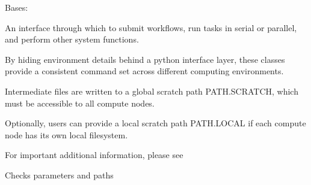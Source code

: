 \documentclass[letterpaper,10pt,english]{sphinxmanual}
\begin{document}
\begin{fulllineitems}
\label{\detokenize{ref/seisflows.system:seisflows.system.lsf_lg.lsf_lg}}
Bases: {\hyperref[\detokenize{ref/seisflows.system:seisflows.system.base.base}]{}}

An interface through which to submit workflows, run tasks in serial or
parallel, and perform other system functions.

By hiding environment details behind a python interface layer, these
classes provide a consistent command set across different computing
environments.

Intermediate files are written to a global scratch path PATH.SCRATCH,
which must be accessible to all compute nodes.

Optionally, users can provide a local scratch path PATH.LOCAL if each
compute node has its own local filesystem.

For important additional information, please see

\begin{fulllineitems}
\label{\detokenize{ref/seisflows.system:seisflows.system.lsf_lg.lsf_lg.check}}
Checks parameters and paths

\end{fulllineitems}


\begin{fulllineitems}
\label{\detokenize{ref/seisflows.system:seisflows.system.lsf_lg.lsf_lg.job_id_list}}
\end{fulllineitems}


\begin{fulllineitems}
\label{\detokenize{ref/seisflows.system:seisflows.system.lsf_lg.lsf_lg.job_status}}
\end{fulllineitems}


\end{fulllineitems}
\end{document}
